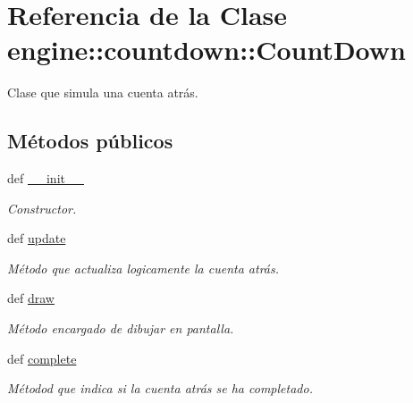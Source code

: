 \hypertarget{classengine_1_1countdown_1_1CountDown}{
\section{\-Referencia de la \-Clase engine\-:\-:countdown\-:\-:\-Count\-Down}
\label{classengine_1_1countdown_1_1CountDown}
}


\-Clase que simula una cuenta atrás.  


\subsection*{\-Métodos públicos}
\begin{DoxyCompactItemize}
\item 
def \hyperlink{classengine_1_1countdown_1_1CountDown_a41fe839411c55c109ada1b401c483450}{\-\_\-\-\_\-init\-\_\-\-\_\-}
\begin{DoxyCompactList}\small\item\em \-Constructor. \end{DoxyCompactList}\item 
\hypertarget{classengine_1_1countdown_1_1CountDown_ac35550fa72c1e6981437a6ccf085dc18}{
def \hyperlink{classengine_1_1countdown_1_1CountDown_ac35550fa72c1e6981437a6ccf085dc18}{update}}
\label{classengine_1_1countdown_1_1CountDown_ac35550fa72c1e6981437a6ccf085dc18}

\begin{DoxyCompactList}\small\item\em \-Método que actualiza logicamente la cuenta atrás. \end{DoxyCompactList}\item 
def \hyperlink{classengine_1_1countdown_1_1CountDown_a12c0df801726567520e52618fe3c2d23}{draw}
\begin{DoxyCompactList}\small\item\em \-Método encargado de dibujar en pantalla. \end{DoxyCompactList}\item 
def \hyperlink{classengine_1_1countdown_1_1CountDown_a37b9f93b3deed4c894b492ccc9e2fd57}{complete}
\begin{DoxyCompactList}\small\item\em \-Métodod que indica si la cuenta atrás se ha completado. \end{DoxyCompactList}\end{DoxyCompactItemize}
